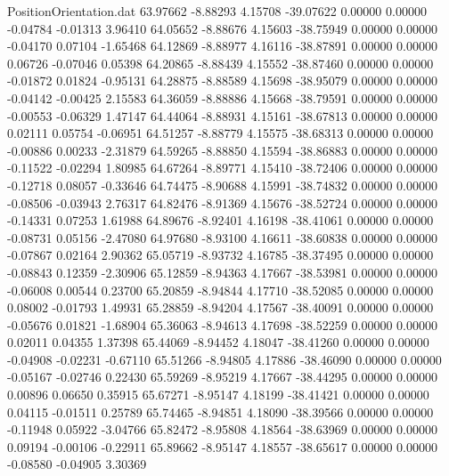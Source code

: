 \begin{filecontents}{PositionOrientation.dat}
  63.97662   -8.88293    4.15708   -39.07622    0.00000    0.00000   -0.04784   -0.01313    3.96410
  64.05652   -8.88676    4.15603   -38.75949    0.00000    0.00000   -0.04170    0.07104   -1.65468
  64.12869   -8.88977    4.16116   -38.87891    0.00000    0.00000    0.06726   -0.07046    0.05398
  64.20865   -8.88439    4.15552   -38.87460    0.00000    0.00000   -0.01872    0.01824   -0.95131
  64.28875   -8.88589    4.15698   -38.95079    0.00000    0.00000   -0.04142   -0.00425    2.15583
  64.36059   -8.88886    4.15668   -38.79591    0.00000    0.00000   -0.00553   -0.06329    1.47147
  64.44064   -8.88931    4.15161   -38.67813    0.00000    0.00000    0.02111    0.05754   -0.06951
  64.51257   -8.88779    4.15575   -38.68313    0.00000    0.00000   -0.00886    0.00233   -2.31879
  64.59265   -8.88850    4.15594   -38.86883    0.00000    0.00000   -0.11522   -0.02294    1.80985
  64.67264   -8.89771    4.15410   -38.72406    0.00000    0.00000   -0.12718    0.08057   -0.33646
  64.74475   -8.90688    4.15991   -38.74832    0.00000    0.00000   -0.08506   -0.03943    2.76317
  64.82476   -8.91369    4.15676   -38.52724    0.00000    0.00000   -0.14331    0.07253    1.61988
  64.89676   -8.92401    4.16198   -38.41061    0.00000    0.00000   -0.08731    0.05156   -2.47080
  64.97680   -8.93100    4.16611   -38.60838    0.00000    0.00000   -0.07867    0.02164    2.90362
  65.05719   -8.93732    4.16785   -38.37495    0.00000    0.00000   -0.08843    0.12359   -2.30906
  65.12859   -8.94363    4.17667   -38.53981    0.00000    0.00000   -0.06008    0.00544    0.23700
  65.20859   -8.94844    4.17710   -38.52085    0.00000    0.00000    0.08002   -0.01793    1.49931
  65.28859   -8.94204    4.17567   -38.40091    0.00000    0.00000   -0.05676    0.01821   -1.68904
  65.36063   -8.94613    4.17698   -38.52259    0.00000    0.00000    0.02011    0.04355    1.37398
  65.44069   -8.94452    4.18047   -38.41260    0.00000    0.00000   -0.04908   -0.02231   -0.67110
  65.51266   -8.94805    4.17886   -38.46090    0.00000    0.00000   -0.05167   -0.02746    0.22430
  65.59269   -8.95219    4.17667   -38.44295    0.00000    0.00000    0.00896    0.06650    0.35915
  65.67271   -8.95147    4.18199   -38.41421    0.00000    0.00000    0.04115   -0.01511    0.25789
  65.74465   -8.94851    4.18090   -38.39566    0.00000    0.00000   -0.11948    0.05922   -3.04766
  65.82472   -8.95808    4.18564   -38.63969    0.00000    0.00000    0.09194   -0.00106   -0.22911
  65.89662   -8.95147    4.18557   -38.65617    0.00000    0.00000   -0.08580   -0.04905    3.30369

\end{filecontents}
